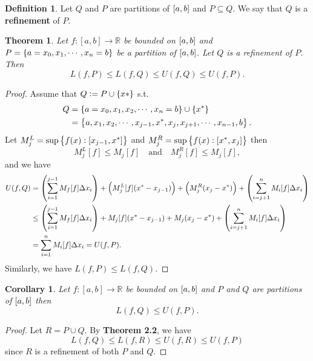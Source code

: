\documentclass[12pt,openany]{book}
\newtheorem{theorem}{Theorem}[chapter]
\newtheorem{corollary}{Corollary}[theorem]
\theoremstyle{definition}
\newtheorem{definition}{Definition}[chapter]
\newcommand{\R}{\mathbb{R}}
\begin{document}
	\begin{tcolorbox}[colframe=defcolor, title={\color{white}\bf Refinement}]
		\begin{definition}
			Let $Q$ and $P$ are partitions of \(\sbr{a,b}\) and $P\subseteq Q$. We say that $Q$ is a \textbf{refinement} of $P$.
		\end{definition}
	\end{tcolorbox}
	\vspace{8pt}
	\begin{tcolorbox}[colframe=thmcolor, title={\color{white}\bf }]
		\begin{theorem}
			Let \(f:[a,b]\to\R\) be bounded on \(\sbr{a,b}\) and \(P=\set{a=x_0,x_1,\cdots,x_n=b}\) be a partition of \(\sbr{a,b}\). Let \(Q\) is a refinement of \(P\). Then \[
			L(f,P)\leq L(f,Q)\leq U(f,Q)\leq U(f,P).
			\]
		\end{theorem}
	\end{tcolorbox}
	\begin{proof}
		Assume that \(Q:=P\cup\set{x*}\) s.t. \begin{align*}
			Q&=\set{a=x_0,x_1,x_2,\cdots,x_n=b}\cup\set{x^*}\\
			&=\set{a,x_1,x_2,\cdots,x_{j-1},x^*,x_j,x_{j+1},\cdots,x_{n-1},b}.
		\end{align*}
		Let \(M_j^L=\sup\set{f(x):[x_{j-1},x^*]}\) and \(
			M_j^R=\sup\set{f(x):[x^*,x_{j}]}\) then \[
		M_j^L[f]\leq M_j[f]\quad\text{and}\quad M_j^R[f]\leq M_j[f],
		\] and we have \begin{align*}
			U(f,Q)
			&=\del{\sum_{i=1}^{j-1}M_f[f]\Delta x_i}+\del{M_j^L[f](x^*-x_{j-1})}+\del{M_j^R(x_{j}-x^*)}+\del{\sum_{i=j+1}^nM_i[f]\Delta x_i}\\
			&\leq\del{\sum_{i=1}^{j-1}M_f[f]\Delta x_i}+{M_j[f](x^*-x_{j-1})}+{M_j(x_{j}-x^*)}+\del{\sum_{i=j+1}^nM_i[f]\Delta x_i}\\
			&=\sum_{i=1}^nM_i[f]\Delta x_i=U(f,P).
		\end{align*} Similarly, we have \(L(f,P)\leq L(f,Q)\).
	\end{proof}
	\vspace{4pt}
	\begin{tcolorbox}[colframe=corcolor, title={\color{white}\bf }]
		\begin{corollary}
			Let \(f:[a,b]\to\R\) be bounded on \(\sbr{a,b}\) and \(P\) and \(Q\) are partitions of \(\sbr{a,b}\) then \[
			L(f,Q)\leq U(f,P).
			\]
		\end{corollary}
	\end{tcolorbox}
	\begin{proof}
		Let \(R=P\cup Q\). By \textbf{Theorem 2.2}, we have \[
		L(f,Q)\leq L(f,R)\leq U(f,R)\leq U(f, P)
		\] since \(R\) is a refinement of both \(P\) and \(Q\).
	\end{proof}
	
\end{document}
